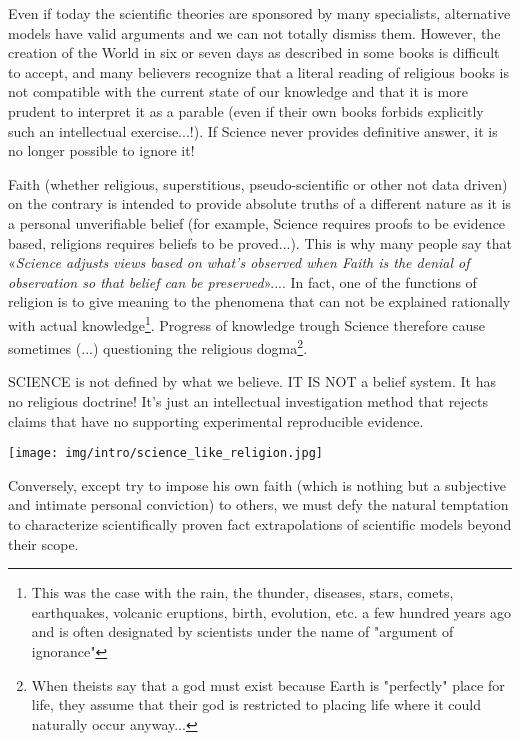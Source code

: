 	Even if today the scientific theories are sponsored by many specialists, alternative models have valid arguments and we can not totally dismiss them. However, the creation of the World in six or seven days as described in some books is difficult to accept, and many believers recognize that a literal reading of religious books is not compatible with the current state of our knowledge and that it is more prudent to interpret it as a parable (even if their own books forbids explicitly such an intellectual exercise...!). If Science never provides definitive answer, it is no longer possible to ignore it!

	Faith (whether religious, superstitious, pseudo-scientific or other not data driven) on the contrary is intended to provide absolute truths of a different nature as it is a personal unverifiable belief (for example, Science requires proofs to be evidence based, religions requires beliefs to be proved...). This is why many people say that «\textit{Science adjusts views based on what's observed when Faith is the denial of observation so that belief can be preserved}».... In fact, one of the functions of religion is to give meaning to the phenomena that can not be explained rationally with actual knowledge\footnote{This was the case with the rain, the thunder, diseases, stars, comets, earthquakes, volcanic eruptions, birth, evolution, etc. a few hundred years ago and is often designated by scientists under the name of "argument of ignorance"}. Progress of knowledge trough Science therefore cause sometimes (...) questioning the religious dogma\footnote{When theists say that a god must exist because Earth is "perfectly" place for life, they assume that their god is restricted to placing life where it could naturally occur anyway...}. 
	
	\begin{fquote}SCIENCE is not defined by what we believe. IT IS NOT a belief system. It has no religious doctrine! It's just an intellectual investigation method that rejects claims that have no supporting experimental reproducible evidence.
 	\end{fquote}
	\begin{center}
		\texttt{[image: img/intro/science\_like\_religion.jpg]}
	\end{center}
	Conversely, except try to impose his own faith (which is nothing but a subjective and intimate personal conviction) to others, we must defy the natural temptation to characterize scientifically proven fact extrapolations of scientific models beyond their scope.

